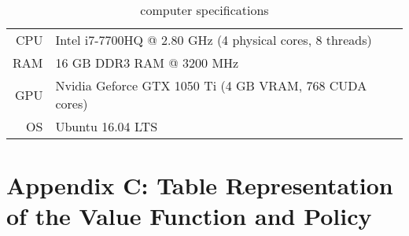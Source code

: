 \begin{table}[h]
	\begin{center}
		\begin{tabular}{r|l}
			CPU & Intel i7-7700HQ @ 2.80 GHz (4 physical cores, 8 threads) \\
			RAM\nomenclature[A]{RAM}{random access memory} & 16 GB DDR3 RAM @ 3200 MHz \\
			GPU & Nvidia Geforce GTX 1050 Ti (4 GB VRAM, 768 CUDA cores) \\
			OS & Ubuntu 16.04 LTS
		\end{tabular}
	\caption{computer specifications}
	\label{tab:pc_specs}
	\end{center}
\end{table}

\chapter{Appendix C: Table Representation of the Value Function and Policy}
\label{appendix_C}

